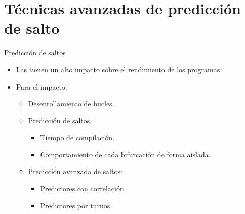 \section{Técnicas avanzadas de predicción de salto}

\begin{frame}[t]{Predicción de saltos}
\begin{itemize}
  \item Las  tienen un alto impacto sobre 
        el rendimiento de los programas.

  \item Para  el impacto:
    \begin{itemize}
      \item Desenrollamiento de bucles.
      \item Predicción de saltos.
        \begin{itemize}
          \item Tiempo de compilación.
          \item Comportamiento de cada bifurcación de forma aislada.
        \end{itemize}
      \item Predicción avanzada de saltos:
        \begin{itemize}
          \item Predictores con correlación.
          \item Predictores por turnos.
        \end{itemize}
    \end{itemize}
\end{itemize}
\end{frame}

